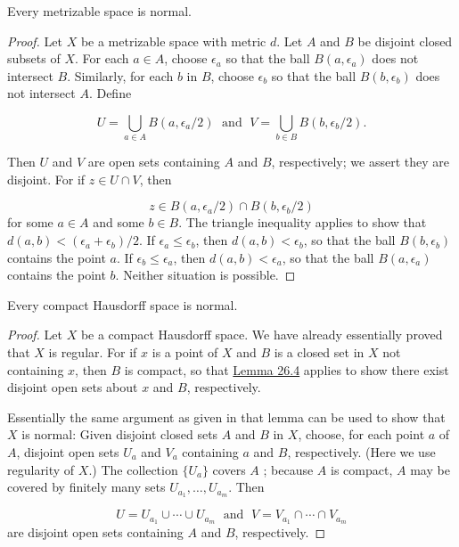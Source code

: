 \begin{theorem}
\label{thm:\thetheorem}
 Every metrizable space is normal.

\end{theorem}

\begin{proof}
Let \(X\) be a metrizable space with metric \(d\). Let \(A\) and \(B\) be disjoint closed subsets of \(X\). For each \(a \in A\), choose \({\epsilon }_{a}\) so that the ball \(B( {a,{\epsilon }_{a}})\) does not intersect \(B\). Similarly, for each \(b\) in \(B\), choose \({\epsilon }_{b}\) so that the ball \(B( {b,{\epsilon }_{b}})\) does not intersect \(A\). Define

\[
U = \mathop{\bigcup }\limits_{{a \in A}}B( {a,{\epsilon }_{a}/2}) \;\text{ and }\;V = \mathop{\bigcup }\limits_{{b \in B}}B( {b,{\epsilon }_{b}/2}).
\]

Then \(U\) and \(V\) are open sets containing \(A\) and \(B\), respectively; we assert they are disjoint. For if \(z \in U \cap V\), then

\[
z \in B( {a,{\epsilon }_{a}/2}) \cap B( {b,{\epsilon }_{b}/2})
\]
for some \(a \in A\) and some \(b \in B\). The triangle inequality applies to show that \(d( {a,b}) < ( {{\epsilon }_{a} + {\epsilon }_{b}}) /2\). If \({\epsilon }_{a} \leq {\epsilon }_{b}\), then \(d( {a,b}) < {\epsilon }_{b}\), so that the ball \(B( {b,{\epsilon }_{b}})\) contains the point \(a\). If \({\epsilon }_{b} \leq {\epsilon }_{a}\), then \(d( {a,b}) < {\epsilon }_{a}\), so that the ball \(B( {a,{\epsilon }_{a}})\) contains the point \(b\). Neither situation is possible.
\end{proof}

\begin{theorem}
\label{thm:\thetheorem}
 Every compact Hausdorff space is normal.

\end{theorem}

\begin{proof}
Let \(X\) be a compact Hausdorff space. We have already essentially proved that \(X\) is regular. For if \(x\) is a point of \(X\) and \(B\) is a closed set in \(X\) not containing \(x\), then \(B\) is compact, so that \hyperref[lem:26.4]{Lemma 26.4} applies to show there exist disjoint open sets about \(x\) and \(B\), respectively.

Essentially the same argument as given in that lemma can be used to show that \(X\) is normal: Given disjoint closed sets \(A\) and \(B\) in \(X\), choose, for each point \(a\) of \(A\), disjoint open sets \(U_{a}\) and \(V_{a}\) containing \(a\) and \(B\), respectively. (Here we use regularity of \(X\).) The collection \(\{ U_{a}\}\) covers \(A\) ; because \(A\) is compact, \(A\) may be covered by finitely many sets \(U_{a_{1}},\ldots ,U_{a_{m}}\). Then

\[
U = U_{a_{1}} \cup \cdots \cup {U}_{a_{m}}\;\text{ and }\;V = V_{a_{1}} \cap \cdots \cap {V}_{a_{m}}
\]
are disjoint open sets containing \(A\) and \(B\), respectively.
\end{proof}

